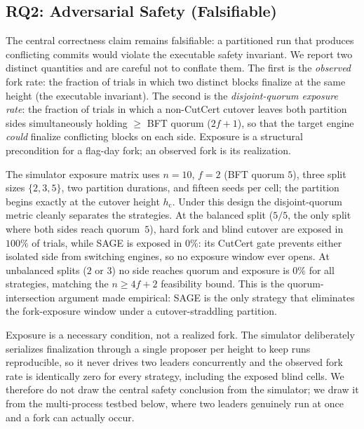 \documentclass[journal]{IEEEtran}
\theoremstyle{remark}
\begin{document}
\subsection{RQ2: Adversarial Safety (Falsifiable)}
The central correctness claim remains falsifiable: a partitioned run that produces conflicting
commits would violate the executable safety invariant. We report two distinct quantities and are
careful not to conflate them. The first is the \emph{observed} fork rate: the fraction of trials
in which two distinct blocks finalize at the same height (the executable invariant). The second
is the \emph{disjoint-quorum exposure rate}: the fraction of trials in which a non-CutCert
cutover leaves both partition sides simultaneously holding $\ge$ BFT quorum ($2f{+}1$), so that
the target engine \emph{could} finalize conflicting blocks on each side. Exposure is a structural
precondition for a flag-day fork; an observed fork is its realization.

The simulator exposure matrix uses $n{=}10$, $f{=}2$ (BFT quorum $5$), three split sizes
$\{2,3,5\}$, two partition durations, and fifteen seeds per cell; the partition begins exactly at
the cutover height $h_{\mathrm{c}}$. Under this design the disjoint-quorum metric cleanly
separates the strategies. At the balanced split ($5/5$, the only split where both sides reach
quorum~$5$), hard fork and blind cutover are exposed in $100\%$ of trials, while SAGE is exposed
in $0\%$: its CutCert gate prevents either isolated side from switching engines, so no exposure
window ever opens. At unbalanced splits ($2$ or $3$) no side reaches quorum and exposure is $0\%$
for all strategies, matching the $n\ge 4f{+}2$ feasibility bound. This is the quorum-intersection
argument made empirical: SAGE is the only strategy that eliminates the fork-exposure window under
a cutover-straddling partition.

Exposure is a necessary condition, not a realized fork. The simulator deliberately serializes
finalization through a single proposer per height to keep runs reproducible, so it never drives
two leaders concurrently and the observed fork rate is identically zero for every strategy,
including the exposed blind cells. We therefore do not draw the central safety conclusion from the
simulator; we draw it from the multi-process testbed below, where two leaders genuinely run at
once and a fork can actually occur.
\end{document}
